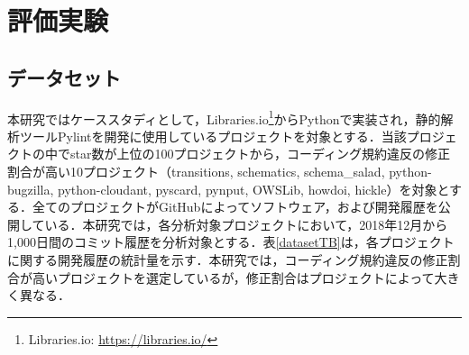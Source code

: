 \documentclass[T,J]{fose} %
\begin{document}


\section{評価実験}\label{sec:result}


\subsection{データセット}
\begin{table}[t]
    \centering
    \caption{分析対象プロジェクトの統計量}
    \label{datasetTB}
\end{table}

本研究ではケーススタディとして，Libraries.io\footnote{Libraries.io: \url{https://libraries.io/}}からPythonで実装され，静的解析ツールPylintを開発に使用しているプロジェクトを対象とする．当該プロジェクトの中でstar数が上位の100プロジェクトから，コーディング規約違反の修正割合が高い10プロジェクト（transitions, schematics, schema\_salad, python-bugzilla, python-cloudant, pyscard, pynput, OWSLib, howdoi, hickle）を対象とする．全てのプロジェクトがGitHubによってソフトウェア，および開発履歴を公開している．本研究では，各分析対象プロジェクトにおいて，2018年12月から1,000日間のコミット履歴を分析対象とする．表\ref{datasetTB}は，各プロジェクトに関する開発履歴の統計量を示す．本研究では，コーディング規約違反の修正割合が高いプロジェクトを選定しているが，修正割合はプロジェクトによって大きく異なる．
\end{document}
